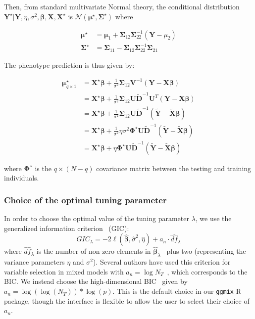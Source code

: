 \documentclass[12pt,letter]{article}\usepackage[]{graphicx}\usepackage[]{color}
\newcommand{\bX}{\textbf{X}}
\newcommand{\bY}{\textbf{Y}}
\newcommand{\bD}{\textbf{D}}
\newcommand{\bXtilde}{\widetilde{\bX}}
\newcommand{\bYtilde}{\widetilde{\bY}}
\newcommand{\bDtilde}{\widetilde{\bD}}
\newcommand{\bU}{\textbf{U}}
\newcommand{\bV}{\textbf{V}}
\newcommand{\bSigma}{\boldsymbol{\Sigma}}
\newcommand{\bmu}{\boldsymbol{\mu}}
\newcommand{\bbeta}{\boldsymbol{\beta}}
\newcommand{\bPhi}{\boldsymbol{\Phi}}
\begin{document}
Then, from standard multivariate Normal theory, the conditional distribution $\bY^\star | \bY, \eta, \sigma^2, \bbeta,\bX, \bX^\star$ is $\mathcal{N}(\bmu^\star, \bSigma^\star)$ where

\begin{align}
\bmu^\star &= \bmu_1 + \bSigma_{12} \bSigma_{22}^{-1} (\bY - \mu_2) \\
\bSigma^\star & = \bSigma_{11} - \bSigma_{12} \bSigma_{22}^{-1} \bSigma_{21}
\end{align}

The phenotype prediction is thus given by:

\begin{align}
\bmu^\star_{q \times 1} & = \bX^\star \bbeta + \frac{1}{\sigma^2} \bSigma_{12} \bV^{-1} (\bY - \bX \bbeta)\\
& = \bX^\star \bbeta + \frac{1}{\sigma^2} \bSigma_{12} \bU \bDtilde^{-1} \bU^T (\bY - \bX \bbeta)\\
& = \bX^\star \bbeta + \frac{1}{\sigma^2} \bSigma_{12} \bU \bDtilde^{-1} (\bYtilde - \bXtilde \bbeta ) \\
& = \bX^\star \bbeta + \frac{1}{\sigma^2} \eta \sigma^2 \bPhi^\star \bU \bDtilde^{-1} (\bYtilde - \bXtilde \bbeta ) \\
& = \bX^\star \bbeta +  \eta  \bPhi^\star \bU \bDtilde^{-1} (\bYtilde - \bXtilde \bbeta )
\end{align}

where $\bPhi^\star$ is the $q \times (N-q)$ covariance matrix between the testing and training individuals.



\subsubsection{Choice of the optimal tuning parameter} \label{subsubsec:gic}

In order to choose the optimal value of the tuning parameter $\lambda$, we use the generalized information criterion~\citep{nishii1984asymptotic} (GIC):
\begin{equation}
	GIC_{\lambda} = -2 \ell(\widehat{\bbeta}, \widehat{\sigma}^2, \widehat{\eta}) + a_n \cdot \widehat{df}_{\lambda}
\end{equation}
where $\widehat{df}_{\lambda}$ is the number of non-zero elements in $\widehat{\bbeta}_{\lambda}$~\citep{zou2007degrees} plus two (representing the variance parameters $\eta$ and $\sigma^2$). Several authors have used this criterion for variable selection in mixed models with $a_n = \log N_T$~\citep{bondell2010joint,schelldorfer2011estimation}, which corresponds to the BIC. We instead choose the high-dimensional BIC~\citep{fan2013tuning} given by $a_n = \log(\log(N_T)) * \log(p)$. This is the default choice in our \texttt{ggmix} R package, though the interface is flexible to allow the user to select their choice of $a_n$.
\end{document}
